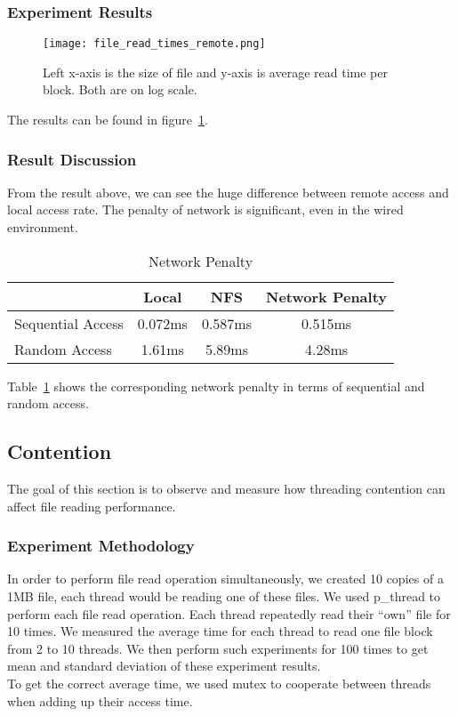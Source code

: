\documentclass{article} %
\begin{document}
\subsubsection{Experiment Results}

\begin{figure}[!htb]
  \centering
  \texttt{[image: file\_read\_times\_remote.png]}
  \caption{Left x-axis is the size of file and y-axis is average read time per block. Both are on log scale.}
  \label{fig:file_read_times_remote}
\end{figure}

The results can be found in figure~\ref{fig:file_read_times_remote}.
\subsubsection{Result Discussion}
From the result above, we can see the huge difference between remote access and local access rate. The
penalty of network is significant, even in the wired environment.

\begin{table}[h]
\centering
\caption{Network Penalty}
\begin{tabular}{|l|c|c|c|}
\hline
                  & Local   & NFS     & Network Penalty \\
\hline
Sequential Access & 0.072ms & 0.587ms & 0.515ms         \\
\hline
Random Access     & 1.61ms  & 5.89ms  & 4.28ms          \\
\hline
\end{tabular}
\label{table:penalty}
\end{table}

Table~\ref{table:penalty} shows the corresponding network penalty in terms of sequential and random access.

\subsection{Contention}
The goal of this section is to observe and measure how threading contention can affect file reading performance.
\subsubsection{Experiment Methodology}
In order to perform file read operation simultaneously, we created 10 copies of a 1MB file, each thread would be reading one of these files. We used p\_thread to perform each file read operation. Each thread repeatedly read their ``own'' file for 10 times. We measured the average time for each thread to read one file block from 2 to 10 threads. We then perform such experiments for 100 times to get mean and standard deviation of these experiment results.\\
To get the correct average time, we used mutex to cooperate between threads when adding up their access time.\\
\end{document}
